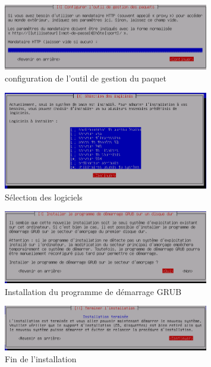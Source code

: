 \documentclass[11pt,a4paper,titlepage, oneside]{article}
\begin{document}
	\newpage
                \begin{figure}[h]
                        \centering
                        \includegraphics[width=0.8\textwidth,natwidth=610,natheight=642]{images/debian19.png}
                        \caption{configuration de l'outil de gestion du paquet}
                \end{figure}

	\newpage
                \begin{figure}[h]
                        \centering
                        \includegraphics[width=0.8\textwidth,natwidth=610,natheight=642]{images/debian20.png}
                        \caption{Sélection des logiciels}
                \end{figure}

	\newpage
                \begin{figure}[h]
                        \centering
                        \includegraphics[width=0.8\textwidth,natwidth=610,natheight=642]{images/debian21.png}
                        \caption{Installation du programme de démarrage GRUB}
                \end{figure}

	\newpage
                \begin{figure}[h]
                        \centering
                        \includegraphics[width=0.8\textwidth,natwidth=610,natheight=642]{images/debian22.png}
                        \caption{Fin de l'installation}
                \end{figure}
\end{document}
